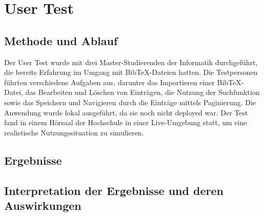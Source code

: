 \chapter{User Test}

\section{Methode und Ablauf}
Der User Test wurde mit drei Master-Studierenden der Informatik durchgeführt, 
die bereits Erfahrung im Umgang mit BibTeX-Dateien hatten. Die Testpersonen führten verschiedene Aufgaben aus,
darunter das Importieren einer BibTeX-Datei, das Bearbeiten und Löschen von Einträgen,
die Nutzung der Suchfunktion sowie das Speichern und Navigieren durch die Einträge mittels Paginierung.
Die Anwendung wurde lokal ausgeführt, da sie noch nicht deployed war. Der Test fand in einem Hörsaal
der Hochschule in einer Live-Umgebung statt, um eine realistische Nutzungssituation zu simulieren.

\section{Ergebnisse}

\section{Interpretation der Ergebnisse und deren Auswirkungen}